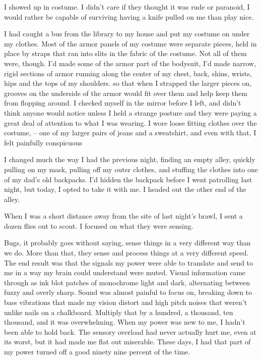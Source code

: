 





I showed up in costume.  I didn't care if they thought it was rude or paranoid, I would rather be capable of surviving having a knife pulled on me than play nice.



I had caught a bus from the library to my house and put my costume on under my clothes.  Most of the armor panels of my costume were separate pieces, held in place by straps that ran into slits in the fabric of the costume.  Not all of them were, though.  I'd made some of the armor part of the bodysuit, I'd made narrow, rigid sections of armor running along the center of my chest, back, shins, wrists, hips and the tops of my shoulders. so that when I strapped the larger pieces on, grooves on the underside of the armor would fit over them and help keep them from flopping around.  I checked myself in the mirror before I left, and didn't think anyone would notice unless I held a strange posture and they were paying a great deal of attention to what I was wearing.  I wore loose fitting clothes over the costume, – one of my larger pairs of jeans and a sweatshirt, and even with that, I felt painfully conspicuous



I changed much the way I had the previous night, finding an empty alley, quickly pulling on my mask, pulling off my outer clothes, and stuffing the clothes into one of my dad's old backpacks.  I'd hidden the backpack before I went patrolling last night, but today, I opted to take it with me.  I headed out the other end of the alley.



When I was a short distance away from the site of last night's brawl, I sent a dozen flies out to scout.  I focused on what they were sensing.



Bugs, it probably goes without saying, sense things in a very different way than we do.  More than that, they sense and process things at a very different speed.  The end result was that the signals my power were able to translate and send to me in a way my brain could understand were muted.  Visual information came through as ink blot patches of monochrome light and dark, alternating between fuzzy and overly sharp.  Sound was almost painful to focus on, breaking down to bass vibrations that made my vision distort and high pitch noises that weren't unlike nails on a chalkboard.  Multiply that by a hundred, a thousand, ten thousand, and it was overwhelming.  When my power was new to me, I hadn't been able to hold back. The sensory overload had never actually hurt me, even at its worst, but it had made me flat out miserable.  These days, I had that part of my power turned off a good ninety nine percent of the time.



